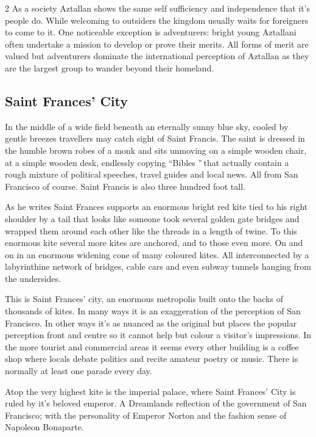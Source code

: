 \begin{multicols}{2}
As a society Aztallan shows the same self sufficiency and independence that it's people do. While welcoming to outsiders the kingdom usually waits for foreigners to come to it. One noticeable exception is adventurers: bright young Aztallani often undertake a mission to develop or prove their merits. All forms of merit are valued but adventurers dominate the international perception of Aztallan as they are the largest group to wander beyond their homeland. 

\subsection*{Saint Frances' City}

In the middle of a wide field beneath an eternally sunny blue sky, cooled by gentle breezes travellers may catch sight of Saint Francis. The saint is dressed in the humble brown robes of a monk and sits unmoving on a simple wooden chair, at a simple wooden desk, endlessly copying \textquotedblleft Bibles \textquotedblright\,that actually contain a rough mixture of political speeches, travel guides and local news. All from San Francisco of course. Saint Francis is also three hundred foot tall.

As he writes Saint Frances supports an enormous bright red kite tied to his right shoulder by a tail that looks like someone took several golden gate bridges and wrapped them around each other like the threads in a length of twine. To this enormous kite several more kites are anchored, and to those even more. On and on in an enormous widening cone of many coloured kites. All interconnected by a labyrinthine network of bridges, cable cars and even subway tunnels hanging from the undersides.

This is Saint Frances' city, an enormous metropolis built onto the backs of thousands of kites. In many ways it is an exaggeration of the perception of San Francisco. In other ways it's as nuanced as the original but places the popular perception front and centre so it cannot help but colour a visitor's impressions. In the more tourist and commercial areas it seems every other building is a coffee shop where locals debate politics and recite amateur poetry or music. There is normally at least one parade every day. 

Atop the very highest kite is the imperial palace, where Saint Frances' City is ruled by it's beloved emperor. A Dreamlands reflection of the government of San Francisco; with the personality of Emperor Norton and the fashion sense of Napoleon Bonaparte. 


\end{multicols}
